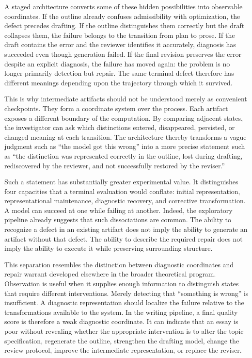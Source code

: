 \documentclass[11pt]{article}
\begin{document}
A staged architecture converts some of these hidden possibilities into observable coordinates. If the outline already confuses admissibility with optimization, the defect precedes drafting. If the outline distinguishes them correctly but the draft collapses them, the failure belongs to the transition from plan to prose. If the draft contains the error and the reviewer identifies it accurately, diagnosis has succeeded even though generation failed. If the final revision preserves the error despite an explicit diagnosis, the failure has moved again: the problem is no longer primarily detection but repair. The same terminal defect therefore has different meanings depending upon the trajectory through which it survived.

This is why intermediate artifacts should not be understood merely as convenient checkpoints. They form a coordinate system over the process. Each artifact exposes a different boundary of the computation. By comparing adjacent states, the investigator can ask which distinctions entered, disappeared, persisted, or changed meaning at each transition. The architecture thereby transforms a vague judgment such as ``the model got this wrong'' into a more precise statement such as ``the distinction was represented correctly in the outline, lost during drafting, rediscovered by the reviewer, and not successfully restored by the reviser.''

Such a statement has substantially greater experimental value. It distinguishes four capacities that a terminal evaluation would conflate: initial representation, representational maintenance, diagnostic recovery, and corrective transformation. A model can succeed at one while failing at another. Indeed, the exploratory pipeline already suggests that such dissociations are common. The ability to recognize a defect in an existing artifact does not imply the ability to generate an artifact without that defect. The ability to describe the required repair does not imply the ability to execute it while preserving surrounding structure.

This separation resembles the distinction between diagnostic coordinates and repair warrant developed elsewhere in the broader theoretical program. Observation is useful when it supplies enough information to distinguish states that require different interventions. Merely detecting that ``something is wrong'' is insufficient. A diagnostic representation should localize the failure relative to the transformations available to the system. In the writing pipeline, a final quality score is therefore a weak diagnostic coordinate. It can indicate that an essay is poor without revealing whether the appropriate intervention is to alter the topic specification, regenerate the outline, strengthen the drafting model, change the review protocol, improve the intermediate representation, or replace the reviser.
\end{document}
